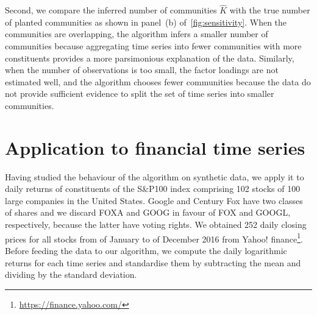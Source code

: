 \documentclass[onecolumn,pre,superscriptaddress, longbibliography, nofootinbib, notitlepage]{revtex4-1}
\begin{document}
Second, we compare the inferred number of communities $\hat K$ with the true number of planted communities as shown in panel~(b) of~\cref{fig:sensitivity}. When the communities are overlapping, the algorithm infers a smaller number of communities because aggregating time series into fewer communities with more constituents provides a more parsimonious explanation of the data. Similarly, when the number of observations is too small, the factor loadings are not estimated well, and the algorithm chooses fewer communities because the data do not provide sufficient evidence to split the set of time series into smaller communities.


\section{\label{sec:application} Application to financial time series}


Having studied the behaviour of the algorithm on synthetic data, we apply it to daily returns of constituents of the S\&P100 index comprising 102 stocks of 100 large companies in the United States. Google and  Century Fox have two classes of shares and we discard FOXA and GOOG in favour of FOX and GOOGL, respectively, because the latter have voting rights. We obtained 252 daily closing prices for all stocks from  of January to  of December 2016 from Yahoo! finance\footnote{\url{https://finance.yahoo.com/}}. Before feeding the data to our algorithm, we compute the daily logarithmic returns for each time series and standardise them by subtracting the mean and dividing by the standard deviation.
\end{document}
